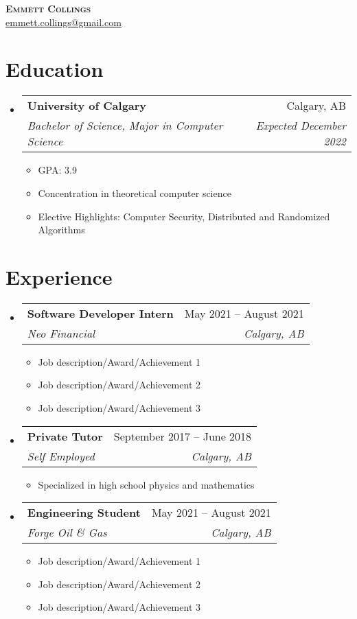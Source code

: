 \documentclass[letterpaper,11pt]{article}
\makeatletter
\newcommand{\resumeItem}[1]{
  \item\small{
    {#1 \vspace{-2pt}}
  }
}
\newcommand{\resumeSubheading}[4]{
  \vspace{-2pt}\item
    \begin{tabular*}{0.97\textwidth}[t]{l@{\extracolsep{\fill}}r}
      \textbf{#1} & #2 \\
      \textit{\small#3} & \textit{\small #4} \\
    \end{tabular*}\vspace{-7pt}
}
\newcommand{\resumeSubHeadingListStart}{\begin{itemize}[leftmargin=0.15in, label={}]}
\newcommand{\resumeSubHeadingListEnd}{\end{itemize}}
\newcommand{\resumeItemListStart}{\begin{itemize}}
\newcommand{\resumeItemListEnd}{\end{itemize}\vspace{-5pt}}
\makeatother
\begin{document}

\begin{center}
  \textbf{\Huge \scshape Emmett Collings} \\ \vspace{1pt}
  \href{mailto:emmett.collings@gmail.com}{\underline{emmett.collings@gmail.com}}
\end{center}


\section{Education}
\resumeSubHeadingListStart
\resumeSubheading
{University of Calgary}{Calgary, AB}
{Bachelor of Science, Major in Computer Science}{Expected December 2022}
\resumeItemListStart
\resumeItem{GPA: 3.9}
\resumeItem{Concentration in theoretical computer science}
\resumeItem{Elective Highlights: Computer Security, Distributed and Randomized Algorithms}

\resumeItemListEnd

\resumeSubHeadingListEnd

\section{Experience}
\resumeSubHeadingListStart

\resumeSubheading
{Software Developer Intern}{May 2021 – August 2021}
{Neo Financial}{Calgary, AB}
\resumeItemListStart
\resumeItem{Job description/Award/Achievement 1}
\resumeItem{Job description/Award/Achievement 2}
\resumeItem{Job description/Award/Achievement 3}
\resumeItemListEnd

\resumeSubheading
{Private Tutor}{September 2017 – June 2018}
{Self Employed}{Calgary, AB}
\resumeItemListStart
\resumeItem{Specialized in high school physics and mathematics}
\resumeItemListEnd

\resumeSubheading
{Engineering Student}{May 2021 – August 2021}
{Forge Oil \& Gas}{Calgary, AB}
\resumeItemListStart
\resumeItem{Job description/Award/Achievement 1}
\resumeItem{Job description/Award/Achievement 2}
\resumeItem{Job description/Award/Achievement 3}
\resumeItemListEnd


\resumeSubHeadingListEnd
\end{document}
